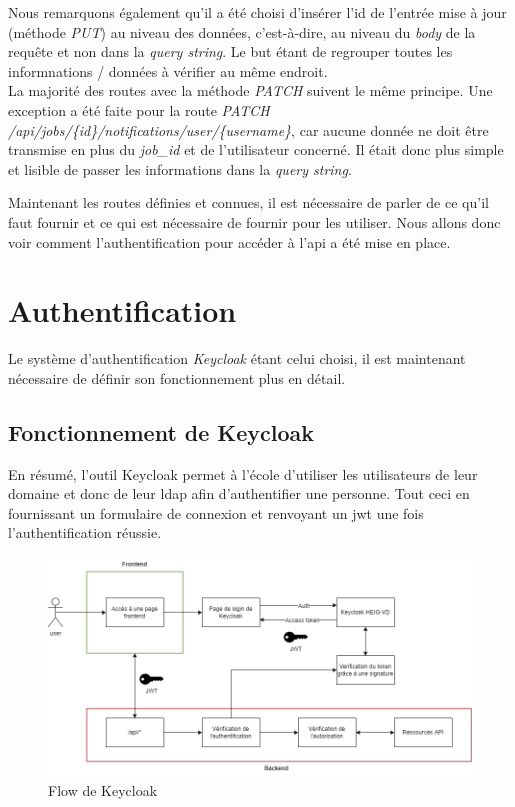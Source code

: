 \documentclass[
    iai, %
    il, %
]{heig-tb}
\begin{document}
Nous remarquons également qu'il a été choisi d'insérer l'id de l'entrée mise à jour (méthode \emph{PUT}) au niveau des données, c'est-à-dire, au niveau du \emph{body} de la requête et non dans la \emph{query string}. Le but étant de regrouper toutes les informnations / données à vérifier au même endroit. \\
La majorité des routes avec la méthode \emph{PATCH} suivent le même principe. Une exception a été faite pour la route \emph{PATCH /api/jobs/\{id\}/notifications/user/\{username\}}, car aucune donnée ne doit être transmise en plus du \emph{job\_id} et de l'utilisateur concerné. Il était donc plus simple et lisible de passer les informations dans la \emph{query string}.

Maintenant les routes définies et connues, il est nécessaire de parler de ce qu'il faut fournir et ce qui est nécessaire de fournir pour les utiliser. Nous allons donc voir comment l'authentification pour accéder à l'\Gls{api} a été mise en place.

\section{Authentification}
Le système d'authentification \emph{Keycloak} étant celui choisi, il est maintenant nécessaire de définir son fonctionnement plus en détail.

\subsection{Fonctionnement de Keycloak}
En résumé, l'outil Keycloak permet à l'école d'utiliser les utilisateurs de leur domaine et donc de leur \Gls{ldap} afin d'authentifier une personne. Tout ceci en fournissant un formulaire de connexion et renvoyant un \Gls{jwt} une fois l'authentification réussie.

\begin{center}
    \begin{figure}[H]
        \includegraphics[width=\textwidth]{./assets/figures/keycloak-flow.drawio.png}
        \caption{Flow de Keycloak \label{keycloak-flow.drawio}}
    \end{figure}
\end{center}
\end{document}
